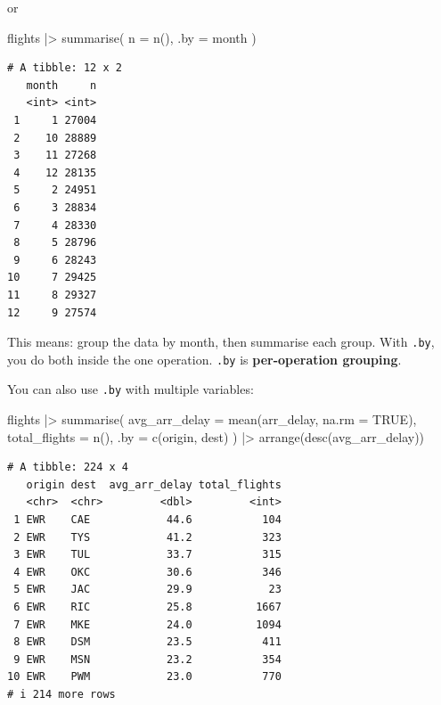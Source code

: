 \documentclass[
  letterpaper,
  DIV=11,
  numbers=noendperiod]{scrreprt}
\newenvironment{Shaded}{\begin{snugshade}}{\end{snugshade}}
\newcommand{\AttributeTok}[1]{\textcolor[rgb]{0.40,0.45,0.13}{#1}}
\newcommand{\ConstantTok}[1]{\textcolor[rgb]{0.56,0.35,0.01}{#1}}
\newcommand{\FunctionTok}[1]{\textcolor[rgb]{0.28,0.35,0.67}{#1}}
\newcommand{\NormalTok}[1]{\textcolor[rgb]{0.00,0.23,0.31}{#1}}
\newcommand{\SpecialCharTok}[1]{\textcolor[rgb]{0.37,0.37,0.37}{#1}}
\begin{document}
or

\begin{Shaded}
\begin{Highlighting}[]
\NormalTok{flights }\SpecialCharTok{|\textgreater{}}
  \FunctionTok{summarise}\NormalTok{(}
    \AttributeTok{n =} \FunctionTok{n}\NormalTok{(),}
    \AttributeTok{.by =}\NormalTok{ month}
\NormalTok{  )}
\end{Highlighting}
\end{Shaded}

\begin{verbatim}
# A tibble: 12 x 2
   month     n
   <int> <int>
 1     1 27004
 2    10 28889
 3    11 27268
 4    12 28135
 5     2 24951
 6     3 28834
 7     4 28330
 8     5 28796
 9     6 28243
10     7 29425
11     8 29327
12     9 27574
\end{verbatim}

This means: group the data by month, then summarise each group. With
\texttt{.by}, you do both inside the one operation. \texttt{.by} is
\textbf{per-operation grouping}.

You can also use \texttt{.by} with multiple variables:

\begin{Shaded}
\begin{Highlighting}[]
\NormalTok{flights }\SpecialCharTok{|\textgreater{}}
  \FunctionTok{summarise}\NormalTok{(}
    \AttributeTok{avg\_arr\_delay =} \FunctionTok{mean}\NormalTok{(arr\_delay, }\AttributeTok{na.rm =} \ConstantTok{TRUE}\NormalTok{),}
    \AttributeTok{total\_flights =} \FunctionTok{n}\NormalTok{(),}
    \AttributeTok{.by =} \FunctionTok{c}\NormalTok{(origin, dest)}
\NormalTok{  ) }\SpecialCharTok{|\textgreater{}}
  \FunctionTok{arrange}\NormalTok{(}\FunctionTok{desc}\NormalTok{(avg\_arr\_delay))}
\end{Highlighting}
\end{Shaded}

\begin{verbatim}
# A tibble: 224 x 4
   origin dest  avg_arr_delay total_flights
   <chr>  <chr>         <dbl>         <int>
 1 EWR    CAE            44.6           104
 2 EWR    TYS            41.2           323
 3 EWR    TUL            33.7           315
 4 EWR    OKC            30.6           346
 5 EWR    JAC            29.9            23
 6 EWR    RIC            25.8          1667
 7 EWR    MKE            24.0          1094
 8 EWR    DSM            23.5           411
 9 EWR    MSN            23.2           354
10 EWR    PWM            23.0           770
# i 214 more rows
\end{verbatim}
\end{document}
